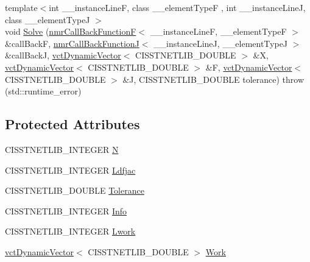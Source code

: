 {\bf }\par
\begin{DoxyCompactItemize}
\item 
{\footnotesize template$<$int \+\_\+\+\_\+instance\+Line\+F, class \+\_\+\+\_\+element\+Type\+F , int \+\_\+\+\_\+instance\+Line\+J, class \+\_\+\+\_\+element\+Type\+J $>$ }\\void \hyperlink{classnmr_fn_jacobian_solver_a085f5cb7f91c8a9e0ef8a69380e3edf4}{Solve} (\hyperlink{classnmr_call_back_function_f}{nmr\+Call\+Back\+Function\+F}$<$ \+\_\+\+\_\+instance\+Line\+F, \+\_\+\+\_\+element\+Type\+F $>$ \&call\+Back\+F, \hyperlink{classnmr_call_back_function_j}{nmr\+Call\+Back\+Function\+J}$<$ \+\_\+\+\_\+instance\+Line\+J, \+\_\+\+\_\+element\+Type\+J $>$ \&call\+Back\+J, \hyperlink{classvct_dynamic_vector}{vct\+Dynamic\+Vector}$<$ C\+I\+S\+S\+T\+N\+E\+T\+L\+I\+B\+\_\+\+D\+O\+U\+B\+L\+E $>$ \&X, \hyperlink{classvct_dynamic_vector}{vct\+Dynamic\+Vector}$<$ C\+I\+S\+S\+T\+N\+E\+T\+L\+I\+B\+\_\+\+D\+O\+U\+B\+L\+E $>$ \&F, \hyperlink{classvct_dynamic_vector}{vct\+Dynamic\+Vector}$<$ C\+I\+S\+S\+T\+N\+E\+T\+L\+I\+B\+\_\+\+D\+O\+U\+B\+L\+E $>$ \&J, C\+I\+S\+S\+T\+N\+E\+T\+L\+I\+B\+\_\+\+D\+O\+U\+B\+L\+E tolerance)  throw (std\+::runtime\+\_\+error)
\end{DoxyCompactItemize}

\subsection*{Protected Attributes}
\begin{DoxyCompactItemize}
\item 
C\+I\+S\+S\+T\+N\+E\+T\+L\+I\+B\+\_\+\+I\+N\+T\+E\+G\+E\+R \hyperlink{classnmr_fn_jacobian_solver_a64a7c452930ff10113eebecb0557a6e5}{N}
\item 
C\+I\+S\+S\+T\+N\+E\+T\+L\+I\+B\+\_\+\+I\+N\+T\+E\+G\+E\+R \hyperlink{classnmr_fn_jacobian_solver_a02cae10a0151e5937759820a96d87dc8}{Ldfjac}
\item 
C\+I\+S\+S\+T\+N\+E\+T\+L\+I\+B\+\_\+\+D\+O\+U\+B\+L\+E \hyperlink{classnmr_fn_jacobian_solver_a674186e39a43be30ebf759fc267feb64}{Tolerance}
\item 
C\+I\+S\+S\+T\+N\+E\+T\+L\+I\+B\+\_\+\+I\+N\+T\+E\+G\+E\+R \hyperlink{classnmr_fn_jacobian_solver_afa9942d18f7d84f9fcb21f1d0e410fd3}{Info}
\item 
C\+I\+S\+S\+T\+N\+E\+T\+L\+I\+B\+\_\+\+I\+N\+T\+E\+G\+E\+R \hyperlink{classnmr_fn_jacobian_solver_a35ca595e6f6bc84e3aed0ac91643356c}{Lwork}
\item 
\hyperlink{classvct_dynamic_vector}{vct\+Dynamic\+Vector}$<$ C\+I\+S\+S\+T\+N\+E\+T\+L\+I\+B\+\_\+\+D\+O\+U\+B\+L\+E $>$ \hyperlink{classnmr_fn_jacobian_solver_aa3feee6872edf26213e56a7309aaa2bf}{Work}
\end{DoxyCompactItemize}



